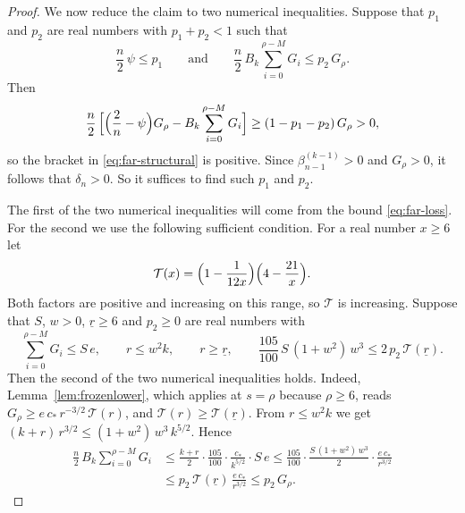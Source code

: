 \documentclass{amsart}
\theoremstyle{definition}
\theoremstyle{remark}
\numberwithin{equation}{section}
\begin{document}
\begin{proof}
We now reduce the claim to two numerical inequalities. Suppose that $p_1$ and $p_2$ are real numbers with $p_1+p_2<1$ such that
\begin{equation}\label{eq:far-closing}
\frac n2\,\psi\le p_1\qquad\text{and}\qquad\frac n2\,B_k\sum_{i=0}^{\rho-M}G_i\le p_2\,G_\rho .
\end{equation}
Then
\[
\frac n2\,\Bigl[\Bigl(\frac2n-\psi\Bigr)G_\rho-B_k\sum_{i=0}^{\rho-M}G_i\Bigr]\ge(1-p_1-p_2)\,G_\rho>0,
\]
so the bracket in \eqref{eq:far-structural} is positive. Since $\beta^{(k-1)}_{n-1}>0$ and $G_\rho>0$, it follows that $\delta_n>0$. So it suffices to find such $p_1$ and $p_2$.

The first of the two numerical inequalities will come from the bound \eqref{eq:far-loss}. For the second we use the following sufficient condition. For a real number $x\ge 6$ let
\[
\mathcal{T}(x)=\Bigl(1-\frac{1}{12x}\Bigr)\Bigl(4-\frac{21}{x}\Bigr).
\]
Both factors are positive and increasing on this range, so $\mathcal{T}$ is increasing. Suppose that $S$, $w>0$, $\underline r\ge 6$ and $p_2\ge 0$ are real numbers with
\begin{equation}\label{eq:far-four}
\sum_{i=0}^{\rho-M}G_i\le S\,e,\qquad r\le w^2k,\qquad r\ge\underline r,\qquad\frac{105}{100}\,S\,(1+w^2)\,w^3\le 2\,p_2\,\mathcal{T}(\underline r).
\end{equation}
Then the second of the two numerical inequalities holds. Indeed, Lemma~\ref{lem:frozenlower}, which applies at $s=\rho$ because $\rho\ge 6$, reads $G_\rho\ge e\,c_\ast\,r^{-3/2}\,\mathcal{T}(r)$, and $\mathcal{T}(r)\ge\mathcal{T}(\underline r)$. From $r\le w^2k$ we get $(k+r)\,r^{3/2}\le(1+w^2)\,w^3\,k^{5/2}$. Hence
\begin{align*}
\frac n2\,B_k\sum_{i=0}^{\rho-M}G_i&\le\frac{k+r}{2}\cdot\frac{105}{100}\cdot\frac{c_\ast}{k^{5/2}}\cdot S\,e\le\frac{105}{100}\cdot\frac{S\,(1+w^2)\,w^3}{2}\cdot\frac{e\,c_\ast}{r^{3/2}}\\
&\le p_2\,\mathcal{T}(\underline r)\,\frac{e\,c_\ast}{r^{3/2}}\le p_2\,G_\rho .
\end{align*}


\end{proof}
\end{document}
